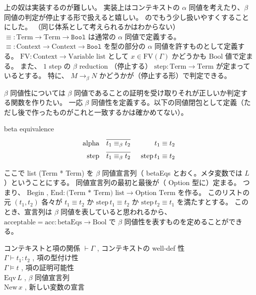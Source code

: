 上の奴は実装するのが難しい。
実装上はコンテキストの \(\alpha\) 同値を考えたり、\(\beta\) 同値の判定が停止する形で扱えると嬉しい。
のでもう少し扱いやすくすることにした。
（同じ体系として考えられるかはわからない）
\(\equiv: \text{Term} \to \text{Term} \to \texttt{Bool}\)
は通常の \(\alpha\) 同値で定義する。
\(\equiv : \text{Context} \to \text{Context} \to \texttt{Bool}\)
を型の部分の \(\alpha\) 同値を許すものとして定義する。
\(\text{FV} : \text{Context} \to \text{Variable list}\)
として \(x \in \text{FV}(\Gamma)\) かどうかも Bool 値で定まる。
また、 \(1\) step の \(\beta\) reduction （停止する）
\(\text{step} : \text{Term} \to \text{Term}\)
が定まっているとする。
特に、 \(M \rightarrow_{\beta} N\) かどうかが（停止する形）で判定できる。

\(\beta\) 同値性については \(\beta\) 同値であることの証明を受け取りそれが正しいか判定する関数を作りたい。
一応 \(\beta\) 同値性を定義する。以下の同値閉包として定義（ただし後で作ったものがこれと一致するかは確かめてない）。
\begin{itembox}[l]{beta equivalence}
\begin{align*}
  \text{alpha} &&
  \infer[]{t_1 \equiv_{\beta} t_2}{} && t_1 \equiv t_2 \\
  \text{step} &&
  \infer[]{t_1 \equiv_{\beta} t_2}{} && \text{step} \, t_1 \equiv t_2 \\
\end{align*}
\end{itembox}

ここで list (Term * Term) を \(\beta\) 同値宣言列（ betaEqs とおく。メタ変数では \(L\) ）ということにする。
同値宣言列の最初と最後が（ Option 型に）定まる。
つまり、 \(\text{Begin , End} : \text{(Term * Term) list} \to \text{Option Term}\) を作る。
このリストの元 \((t_1 , t_2)\) 各々が \(t_1 \equiv t_2\) か \(\text{step} \, t_1 \equiv t_2\) か \(\text{step} \, t_2 \equiv t_1\) を満たすとする。
このとき、宣言列は \(\beta\) 同値を表していると思われるから、\(\text{acceptable} = \text{acc} : \text{betaEqs} \to \text{Bool}\) で \(\beta\) 同値性を表すものを定めることができる。

\begin{itembox}[l]{コンテキストと項の関係}
  \(\vdash \Gamma\) , コンテキストの well-def 性 \\
  \(\Gamma \vdash t_1 : t_2\) , 項の型付け性 \\
  \(\Gamma \vDash t\) , 項の証明可能性 \\
  \(\text{Eqv} \, L\) , \(\beta\) 同値宣言列 \\
  \(\text{New} \, x\) , 新しい変数の宣言
\end{itembox}

